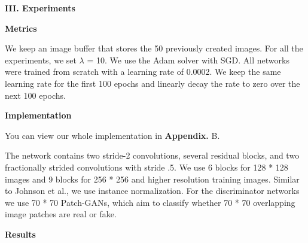 \documentclass[a4paper]{article}
\begin{document}
\vspace{5mm}
\begin{center}
\LARGE\textbf{III. Experiments} \\
\end{center}

\vspace{2mm}
\begin{center}
\large\textbf{Metrics} \\
\end{center}

\large{We keep an image buffer that stores the 50 previously created images. For all the experiments, we set $\lambda$ = 10. We use the Adam solver with SGD. All networks were trained from scratch with a learning rate of 0.0002. We keep the same learning rate for the first 100 epochs and linearly decay the rate to zero over the next 100 epochs.}

\vspace{2mm}
\begin{center}
\large\textbf{Implementation} \\
\end{center}

\large{You can view our whole implementation in \textbf{Appendix.} B.

The network contains two stride-2 convolutions, several residual blocks, and two fractionally strided convolutions with stride .5. We use 6 blocks for 128 * 128 images and 9 blocks for 256 * 256 and higher resolution training images. Similar to Johnson et al., we use instance normalization. For the discriminator networks we use 70 * 70 \textsf{Patch-GANs}, which aim to classify whether 70 * 70 overlapping image patches are real or fake.}

\vspace{2mm}
\begin{center}
\large\textbf{Results} \\
\end{center}
\end{document}
